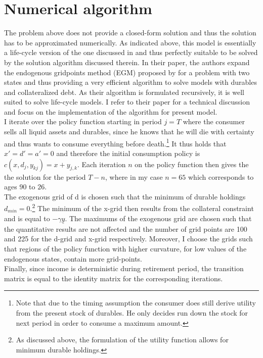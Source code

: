 \documentclass[a4paper,12pt,legno]{article}
\begin{document}
\section{Numerical algorithm}

The problem above does not provide a closed-form solution and thus the solution has to be approximated numerically. As indicated above, this model is essentially a life-cycle version of the one discussed in \cite{hintermaier2010} and thus perfectly suitable to be solved by the solution algorithm discussed therein. In their paper, the authors expand the endogenous gridpoints method (EGM) proposed by \cite{carroll2006} for a problem with two states and thus providing a very efficient algorithm to solve models with durables and collateralized debt. As their algorithm is formulated recursively, it is well suited to solve life-cycle models. I refer to their paper for a technical discussion and focus on the implementation of the algorithm for present model.\\
I iterate over the policy function starting in period $j = T$ where the consumer sells all liquid assets and durables, since he knows that he will die with certainty and thus wants to consume everything before death.\footnote{Note that due to the timing assumption the consumer does still derive utility from the present stock of durables. He only decides run down the stock for next period in order to consume a maximum amount.} It thus holds that $x'=d'=a'=0$ and therefore the initial consumption policy is $c(x,d_{j},y_{kj})=x+y_{j,k}$. Each iteration $n$ on the policy function then gives the the solution for the period $T-n$, where in my case $n=65$ which corresponds to ages $90$ to $26$. \\
The exogenous grid of d is chosen such that the minimum of durable holdings $d_{min} = 0$.\footnote{As discussed above, the formulation of the utility function allows for minimum durable holdings.} The minimum of the x-grid then results from the collateral constraint and is equal to $-\gamma\underline{y}$. The maximums of the exogenous grid are chosen such that the quantitative results are not affected and the number of grid points are 100 and 225 for the d-grid and x-grid respectively. Moreover, I choose the grids such that regions of the policy function with higher curvature, for low values of the endogenous states, contain more grid-points.\\
Finally, since income is deterministic during retirement period, the transition matrix is equal to the identity matrix for the corresponding iterations.
\end{document}
